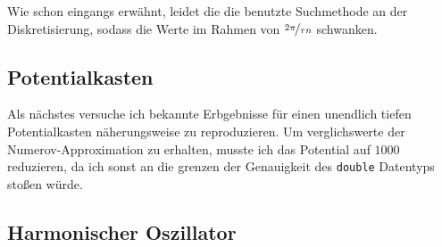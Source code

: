 \documentclass[10pt,a4paper,german]{scrartcl}
\begin{document}
			
			
			Wie schon eingangs erwähnt, leidet die die benutzte Suchmethode an
			der Diskretisierung, sodass die Werte im Rahmen von $\nicefrac{2\pi}{\tau n}$
			schwanken.
  	\subsection{Potentialkasten}
			
			Als nächstes versuche ich bekannte Erbgebnisse für einen
			unendlich tiefen Potentialkasten näherungsweise zu reproduzieren.
			Um verglichswerte der Numerov-Approximation zu erhalten, musste ich
			das Potential auf $1000$ reduzieren, da ich sonst an die grenzen der
			Genauigkeit des \lstinline!double! Datentyps stoßen würde.
			

			
  	\subsection{Harmonischer Oszillator}
			
			
\end{document}
